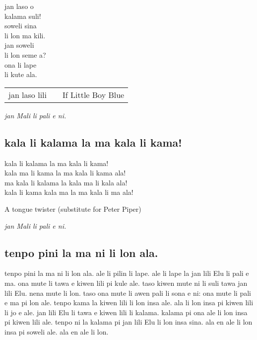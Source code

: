 jan laso o  \\
kalama suli!  \\
soweli sina  \\
li lon ma kili.  \\
jan soweli  \\
li lon seme a?  \\
ona li lape  \\
li kute ala.  \\

\begin{supertabular}{p{5,5cm}|ll}
jan laso lili && If Little Boy Blue \\
\end{supertabular}

\textit{jan Mali li pali e ni. \cite{www:astrodonunt:01}}

\subsection{kala li kalama la ma kala li kama!}

kala li kalama la ma kala li kama!           \\
kala ma li kama la ma kala li kama ala!      \\
ma kala li kalama la kala ma li kala ala!    \\
kala li kama kala ma la ma kala li ma ala!

A tongue twister (substitute for Peter Piper)

\textit{jan Mali li pali e ni. \cite{www:astrodonunt:01}}


\subsection{tenpo pini la ma ni li lon ala.}

tenpo pini la ma ni li lon ala. 
ale li pilin li lape. 
ale li lape la jan lili Elu li pali e ma. 
ona mute li tawa e kiwen lili pi kule ale. 
taso kiwen mute ni li suli tawa jan lili Elu. 
nena mute li lon.  
taso ona mute li awen pali li sona e ni: ona mute li pali e ma pi lon ale. 
tenpo kama la kiwen lili li lon insa ale. 
ala li lon insa pi kiwen lili li jo e ale. 
jan lili Elu li tawa e kiwen lili li kalama. 
kalama pi ona ale li lon insa pi kiwen lili ale.  
tenpo ni la kalama pi jan lili Elu li lon insa sina. 
ala en ale li lon insa pi soweli ale. 
ala en ale li lon.

